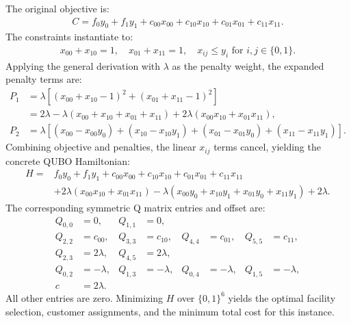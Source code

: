 \documentclass[12pt]{article}
\begin{document}
The original objective is:
\begin{align}
C = f_0 y_0 + f_1 y_1 + c_{00} x_{00} + c_{10} x_{10} + c_{01} x_{01} + c_{11} x_{11}.
\end{align}
The constraints instantiate to:
\begin{align}
x_{00} + x_{10} = 1, \quad x_{01} + x_{11} = 1, \quad x_{ij} \le y_i \text{ for } i,j \in \{0,1\}.
\end{align}
Applying the general derivation with $\lambda$ as the penalty weight, the expanded penalty terms are:
\begin{align}
P_1 &= \lambda \left[ (x_{00} + x_{10} - 1)^2 + (x_{01} + x_{11} - 1)^2 \right] \nonumber \\
&= 2\lambda - \lambda(x_{00} + x_{10} + x_{01} + x_{11}) + 2\lambda(x_{00}x_{10} + x_{01}x_{11}), \nonumber \\
P_2 &= \lambda \left[ (x_{00} - x_{00}y_0) + (x_{10} - x_{10}y_1) + (x_{01} - x_{01}y_0) + (x_{11} - x_{11}y_1) \right].
\end{align}
Combining objective and penalties, the linear $x_{ij}$ terms cancel, yielding the concrete QUBO Hamiltonian:
\begin{align}
H = &f_0 y_0 + f_1 y_1 + c_{00} x_{00} + c_{10} x_{10} + c_{01} x_{01} + c_{11} x_{11} \nonumber \\
&+ 2\lambda(x_{00}x_{10} + x_{01}x_{11}) - \lambda(x_{00}y_0 + x_{10}y_1 + x_{01}y_0 + x_{11}y_1) + 2\lambda.
\end{align}
The corresponding symmetric Q matrix entries and offset are:
\begin{align}
Q_{0,0} &= 0, & Q_{1,1} &= 0, \nonumber \\
Q_{2,2} &= c_{00}, & Q_{3,3} &= c_{10}, & Q_{4,4} &= c_{01}, & Q_{5,5} &= c_{11}, \nonumber \\
Q_{2,3} &= 2\lambda, & Q_{4,5} &= 2\lambda, \nonumber \\
Q_{0,2} &= -\lambda, & Q_{1,3} &= -\lambda, & Q_{0,4} &= -\lambda, & Q_{1,5} &= -\lambda, \nonumber \\
c &= 2\lambda.
\end{align}
All other entries are zero. Minimizing $H$ over $\{0,1\}^6$ yields the optimal facility selection, customer assignments, and the minimum total cost for this instance.
\end{document}
